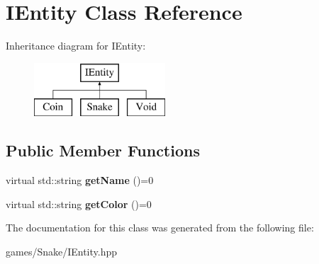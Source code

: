 \hypertarget{class_i_entity}{}\section{I\+Entity Class Reference}
\label{class_i_entity}
Inheritance diagram for I\+Entity\+:\begin{figure}[H]
\begin{center}
\leavevmode
\includegraphics[height=2.000000cm]{class_i_entity}
\end{center}
\end{figure}
\subsection*{Public Member Functions}
\begin{DoxyCompactItemize}
\item 
\mbox{\label{class_i_entity_adee9ecd717a48ac4cbbc11fb1e3c75cf}} 
virtual std\+::string {\bfseries get\+Name} ()=0
\item 
\mbox{\label{class_i_entity_a08b5f22489e8b78f3558414d86a3ec37}} 
virtual std\+::string {\bfseries get\+Color} ()=0
\end{DoxyCompactItemize}


The documentation for this class was generated from the following file\+:\begin{DoxyCompactItemize}
\item 
games/\+Snake/I\+Entity.\+hpp\end{DoxyCompactItemize}
